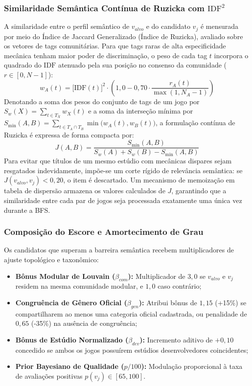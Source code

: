 \documentclass[conference]{IEEEtran}
\begin{document}
\subsubsection{Similaridade Semântica Contínua de Ruzicka com $\text{IDF}^2$}
A similaridade entre o perfil semântico de $v_{alvo}$ e do candidato $v_j$ é mensurada por meio do Índice de Jaccard Generalizado (Índice de Ruzicka), avaliado sobre os vetores de tags comunitárias. Para que tags raras de alta especificidade mecânica tenham maior poder de discriminação, o peso de cada tag $t$ incorpora o quadrado do $\text{IDF}$ atenuado pela sua posição no consenso da comunidade ($r \in [0, N-1]$):
\begin{equation}
w_A(t) = \big[\text{IDF}(t)\big]^2 \cdot \left(1{,}0 - 0{,}70 \cdot \frac{r_A(t)}{\max(1, N_A - 1)}\right)
\label{eq:peso_tag}
\end{equation}
Denotando a soma dos pesos do conjunto de tags de um jogo por $S_w(X) = \sum_{t \in T_X} w_X(t)$ e a soma da interseção mínima por $S_{\min}(A, B) = \sum_{t \in T_A \cap T_B} \min\big(w_A(t), w_B(t)\big)$, a formulação contínua de Ruzicka é expressa de forma compacta por:
\begin{equation}
J(A, B) = \frac{S_{\min}(A, B)}{S_w(A) + S_w(B) - S_{\min}(A, B)}
\label{eq:ruzicka}
\end{equation}
Para evitar que títulos de um mesmo estúdio com mecânicas dispares sejam resgatados indevidamente, impõe-se um corte rígido de relevância semântica: se $J(v_{alvo}, v_j) < 0{,}20$, o item é descartado. Um mecanismo de memoização em tabela de dispersão armazena os valores calculados de $J$, garantindo que a similaridade entre cada par de jogos seja processada exatamente uma única vez durante a BFS.

\subsubsection{Composição do Escore e Amortecimento de Grau}
Os candidatos que superam a barreira semântica recebem multiplicadores de ajuste topológico e taxonômico:
\begin{itemize}
    \item \textbf{Bônus Modular de Louvain ($\beta_{com}$):} Multiplicador de $3{,}0$ se $v_{alvo}$ e $v_j$ residem na mesma comunidade modular, e $1{,}0$ caso contrário;
    \item \textbf{Congruência de Gênero Oficial ($\beta_{gen}$):} Atribui bônus de $1{,}15$ (+15\%) se compartilharem ao menos uma categoria oficial cadastrada, ou penalidade de $0{,}65$ (-35\%) na ausência de congruência;
    \item \textbf{Bônus de Estúdio Normalizado ($\beta_{dev}$):} Incremento aditivo de $+0{,}10$ concedido se ambos os jogos possuírem estúdios desenvolvedores coincidentes;
    \item \textbf{Prior Bayesiano de Qualidade ($p/100$):} Modulação proporcional à taxa de avaliações positivas $p(v_j) \in [65, 100]$.
\end{itemize}
\end{document}
